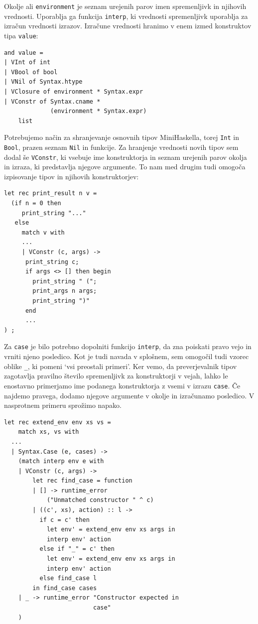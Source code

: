 \documentclass[a4paper,12pt,openright]{book}
\begin{document}
Okolje ali \lstinline{environment} je seznam urejenih parov imen spremenljivk in njihovih vrednosti. Uporablja ga funkcija \lstinline{interp}, ki vrednosti spremenljivk uporablja za izračun 
vrednosti izrazov. Izračune vrednosti hranimo v enem izmed konstruktov tipa \lstinline{value}: 
\begin{lstlisting}
and value =
| VInt of int
| VBool of bool
| VNil of Syntax.htype
| VClosure of environment * Syntax.expr
| VConstr of Syntax.cname * 
             (environment * Syntax.expr) 
    list
\end{lstlisting}
Potrebujemo način za shranjevanje osnovnih tipov MiniHaskella, torej \lstinline{Int} in \lstinline{Bool}, prazen seznam \lstinline{Nil} in funkcije. Za hranjenje vrednosti novih tipov sem dodal še 
\lstinline{VConstr}, ki vsebuje ime konstruktorja in seznam urejenih parov okolja in izraza, ki predstavlja njegove argumente. To nam med drugim tudi omogoča izpisovanje tipov in njihovih 
konstruktorjev:
\begin{lstlisting}
let rec print_result n v =
  (if n = 0 then
     print_string "..."
   else
     match v with
     ...
     | VConstr (c, args) ->
      print_string c;
      if args <> [] then begin
        print_string " (";
        print_args n args;
        print_string ")"
      end
      ...
) ;
\end{lstlisting}

Za \lstinline{case} je bilo potrebno dopolniti funkcijo \lstinline{interp}, da zna poiskati pravo vejo in vrniti njeno posledico. Kot je tudi navada v splošnem, sem omogočil tudi vzorec oblike \lstinline{_}, ki 
pomeni `vsi preostali primeri'. Ker vemo, da preverjevalnik tipov zagotavlja pravilno število spremenljivk za konstruktorji v vejah, lahko le enostavno primerjamo ime podanega 
konstruktorja z vsemi v izrazu \lstinline{case}. Če najdemo pravega, dodamo njegove argumente v okolje in izračunamo posledico. V nasprotnem primeru sprožimo napako. 
\begin{lstlisting}
let rec extend_env env xs vs =
    match xs, vs with
  ...
  | Syntax.Case (e, cases) ->
    (match interp env e with
    | VConstr (c, args) ->
        let rec find_case = function
        | [] -> runtime_error 
            ("Unmatched constructor " ^ c)
        | ((c', xs), action) :: l ->
          if c = c' then
            let env' = extend_env env xs args in
            interp env' action
          else if "_" = c' then
            let env' = extend_env env xs args in
            interp env' action
          else find_case l
        in find_case cases
    | _ -> runtime_error "Constructor expected in 
                         case"
    )
\end{lstlisting}
\end{document}
